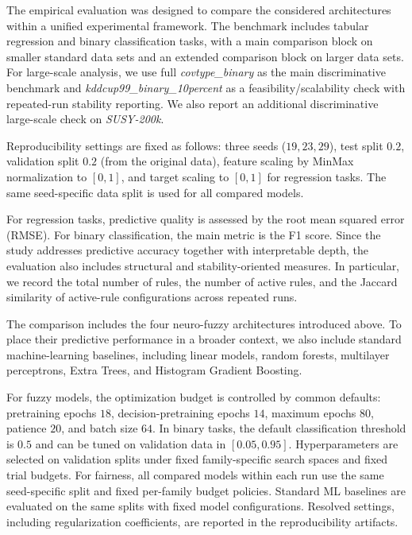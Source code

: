 \documentclass[runningheads]{llncs}
\begin{document}
The empirical evaluation was designed to compare the considered architectures within a unified experimental framework. The benchmark includes tabular regression and binary classification tasks, with a main comparison block on smaller standard data sets and an extended comparison block on larger data sets. For large-scale analysis, we use full \textit{covtype\_binary} as the main discriminative benchmark and \textit{kddcup99\_binary\_10percent} as a feasibility/scalability check with repeated-run stability reporting. We also report an additional discriminative large-scale check on \textit{SUSY-200k}.

Reproducibility settings are fixed as follows: three seeds ($19,23,29$), test split $0.2$, validation split $0.2$ (from the original data), feature scaling by MinMax normalization to $[0,1]$, and target scaling to $[0,1]$ for regression tasks. The same seed-specific data split is used for all compared models.

For regression tasks, predictive quality is assessed by the root mean squared error (RMSE). For binary classification, the main metric is the F1 score. Since the study addresses predictive accuracy together with interpretable depth, the evaluation also includes structural and stability-oriented measures. In particular, we record the total number of rules, the number of active rules, and the Jaccard similarity of active-rule configurations across repeated runs.

The comparison includes the four neuro-fuzzy architectures introduced above. To place their predictive performance in a broader context, we also include standard machine-learning baselines, including linear models, random forests, multilayer perceptrons, Extra Trees, and Histogram Gradient Boosting.

For fuzzy models, the optimization budget is controlled by common defaults: pretraining epochs $18$, decision-pretraining epochs $14$, maximum epochs $80$, patience $20$, and batch size $64$. In binary tasks, the default classification threshold is $0.5$ and can be tuned on validation data in $[0.05,0.95]$. Hyperparameters are selected on validation splits under fixed family-specific search spaces and fixed trial budgets. For fairness, all compared models within each run use the same seed-specific split and fixed per-family budget policies. Standard ML baselines are evaluated on the same splits with fixed model configurations. Resolved settings, including regularization coefficients, are reported in the reproducibility artifacts.
\end{document}
